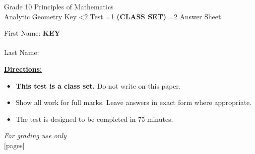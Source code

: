 \documentclass[addpoints]{exam}
\newcommand{\event}{Analytic Geometry}
\newcommand{\tournament}{}
\def\type{0}
\begin{document}
\begin{center}
    {\huge Grade 10 Principles of Mathematics \\ \event
    \ifprintanswers \space Key
    \else \space \ifnum\type<2 Test \fi \ifnum\type=1 \textbf{(CLASS SET)} \fi
          \ifnum\type=2 Answer Sheet \fi
    \fi \\ \vspace{3mm}\tournament\vspace{1mm}}
\end{center}

\vspace{.25\textheight}

\begin{center}
    First Name: \ifprintanswers
    \underline{\hspace{3.5cm}}\textbf{KEY}\underline{\hspace{5.5cm}}\\\ \vspace{5mm}
    \else \underline{\hspace{10cm}}\\ \vspace{5mm} \fi
    Last Name: \underline{\hspace{10cm}}\\ \vspace{5mm}
\end{center}

\noindent\textbf{\underline{Directions:}}
\begin{itemize}
    \ifnum\type=1 \item \textbf{This test is a class set.} Do not write on this paper. \fi
    \item Show all work for full marks. Leave answers in exact form where appropriate.
    \item The test is designed to be completed in 75 minutes.
\end{itemize}
\begin{center}
\textit{For grading use only}\\
[pages]
\end{center}
\end{document}
